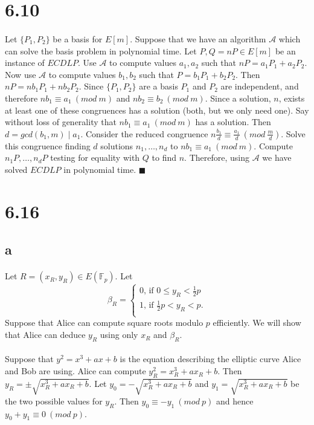 \documentclass[letterpaper,12pt,oneside,onecolumn]{report}
\begin{document}
\section*{6.10}
\paragraph{}
Let $\{P_1, P_2 \}$ be a basis for $E[m]$. Suppose that we have an algorithm $\mathcal{A}$ which can solve the basis problem in polynomial time. Let $P, Q=nP \in E[m]$ be an instance of $ECDLP$. Use $\mathcal{A}$ to compute values $a_1, a_2$ such that $nP = a_1P_1 + a_2P_2$. Now use $\mathcal{A}$ to compute values $b_1, b_2$ such that $P = b_1P_1 + b_2P_2$. Then $nP = nb_1P_1 + nb_2P_2$. Since $\{ P_1, P_2 \}$ are a basis $P_1$ and $P_2$ are independent, and therefore $nb_1 \equiv a_1\ (mod\ m)$ and $nb_2 \equiv b_2\ (mod\ m)$. Since a solution, $n$, exists at least one of these congruences has a solution (both, but we only need one). Say without loss of generality that $nb_1 \equiv a_1\ (mod\ m)$ has a solution. Then $d = gcd(b_1, m) \mid a_1$. Consider the reduced congruence $n\frac{b_1}{d} \equiv \frac{a_1}{d}\ (mod\ \frac{m}{d})$. Solve this congruence finding $d$ solutions $n_1, \dots, n_d$ to $nb_1 \equiv a_1\ (mod\ m)$. Compute $n_1P, \dots, n_dP$ testing for equality with $Q$ to find $n$. Therefore, using $\mathcal{A}$ we have solved $ECDLP$ in polynomial time. $\blacksquare$
\section*{6.16}
\subsection*{a}
\paragraph{}
Let $R = (x_R, y_R) \in E(\mathbb{F}_p)$. Let
\begin{equation*}
\beta_R = \begin{cases}
0 \text{, if $0 \leq y_R < \frac{1}{2}p$}\\
1 \text{, if $\frac{1}{2}p < y_R < p$.}\\
\end{cases}
\end{equation*}
Suppose that Alice can compute square roots modulo $p$ efficiently. We will show that Alice can deduce $y_R$ using only $x_R$ and $\beta_R$. 
\paragraph{}
Suppose that $y^2 = x^3 + ax + b$ is the equation describing the elliptic curve Alice and Bob are using. Alice can compute $y_R^2 = x_R^3 + ax_R + b$. Then $y_R = \pm \sqrt{x_R^3 + ax_R + b}$. Let $y_0 = -\sqrt{x_R^3 + ax_R + b}$ and $y_1 = \sqrt{x_R^3 + ax_R + b}$ be the two possible values for $y_R$. Then $y_0 \equiv -y_1\ (mod\ p)$ and hence $y_0 + y_1 \equiv 0\ (mod\ p)$.
\end{document}
